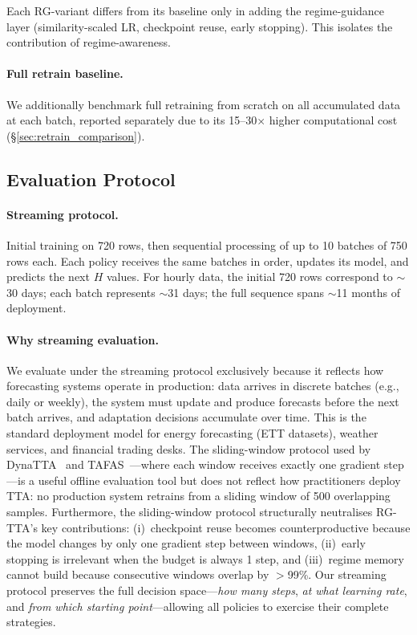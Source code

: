 \documentclass[journal]{IEEEtran}
\begin{document}
Each RG-variant differs from its baseline only in adding the regime-guidance layer (similarity-scaled LR, checkpoint reuse, early stopping). This isolates the contribution of regime-awareness.

\paragraph{Full retrain baseline.} We additionally benchmark full retraining from scratch on all accumulated data at each batch, reported separately due to its 15--30$\times$ higher computational cost (\S\ref{sec:retrain_comparison}).

\subsection{Evaluation Protocol}

\paragraph{Streaming protocol.} Initial training on 720 rows, then sequential processing of up to 10 batches of 750 rows each. Each policy receives the same batches in order, updates its model, and predicts the next $H$ values. For hourly data, the initial 720 rows correspond to $\sim$30 days; each batch represents $\sim$31 days; the full sequence spans $\sim$11 months of deployment.

\paragraph{Why streaming evaluation.} We evaluate under the streaming protocol exclusively because it reflects how forecasting systems operate in production: data arrives in discrete batches (e.g., daily or weekly), the system must update and produce forecasts before the next batch arrives, and adaptation decisions accumulate over time. This is the standard deployment model for energy forecasting (ETT datasets), weather services, and financial trading desks. The sliding-window protocol used by DynaTTA~\cite{grover2025dynatta} and TAFAS~\cite{kim2025tafas}---where each window receives exactly one gradient step---is a useful offline evaluation tool but does not reflect how practitioners deploy TTA: no production system retrains from a sliding window of 500 overlapping samples. Furthermore, the sliding-window protocol structurally neutralises RG-TTA's key contributions: (i)~checkpoint reuse becomes counterproductive because the model changes by only one gradient step between windows, (ii)~early stopping is irrelevant when the budget is always 1 step, and (iii)~regime memory cannot build because consecutive windows overlap by $>$99\%. Our streaming protocol preserves the full decision space---\emph{how many steps}, \emph{at what learning rate}, and \emph{from which starting point}---allowing all policies to exercise their complete strategies.
\end{document}
